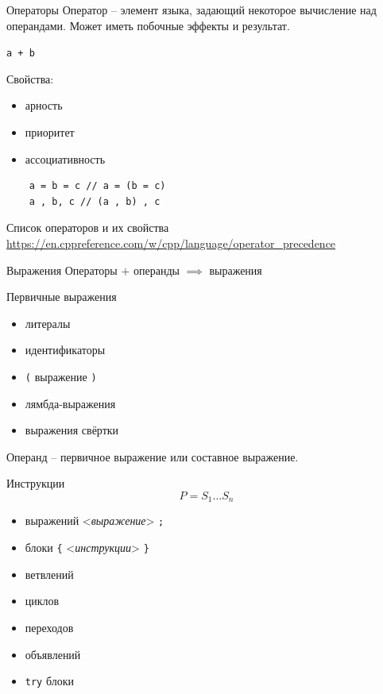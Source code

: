 \documentclass[unknownkeysallowed,xcolor=table]{beamer}
\begin{document}
\begin{frame}[fragile]{Операторы}
  Оператор -- элемент языка, задающий некоторое вычисление над операндами. Может иметь побочные эффекты и результат.
  
  \vspace{1em}

  \lstinline{a + b}
  
  \vspace{2em}

  Свойства:
  \begin{itemize}
    \item арность
    \item приоритет
    \item ассоциативность
  \end{itemize}
  \begin{lstlisting}
    a = b = c // a = (b = c)
    a , b, c // (a , b) , c
  \end{lstlisting}
\end{frame}

\begin{frame}{Список операторов и их свойства}
  \url{https://en.cppreference.com/w/cpp/language/operator_precedence}
\end{frame}

\begin{frame}[fragile]{Выражения}
  Операторы $+$ операнды $\implies$ выражения

  \vspace{1em}
  Первичные выражения
  \begin{itemize}
    \item литералы
    \item идентификаторы
    \item \lstinline{(} выражение \lstinline{)}
    \item лямбда-выражения
    \item выражения свёртки
  \end{itemize}

  \vspace{1em}
  Операнд -- первичное выражение или составное выражение.
\end{frame}

\begin{frame}[fragile]{Инструкции}
  \[
    P = S_1 \dotso S_n
  \]
  \begin{itemize}
    \item выражений <\emph{выражение}> \lstinline{;}
    \item блоки \lstinline|{| <\emph{инструкции}> \lstinline|}|
    \item ветвлений
    \item циклов
    \item переходов
    \item объявлений
    \item \lstinline{try} блоки
  \end{itemize}
\end{frame}
\end{document}
